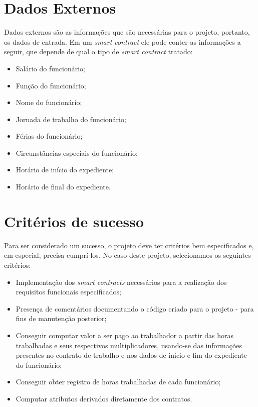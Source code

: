 \documentclass{article}
\begin{document}
\section{Dados Externos}
Dados externos são as informações que são necessárias para o projeto, portanto, os dados de entrada. Em um \textit{smart contract} ele pode conter as informações a seguir, que depende de qual o tipo de \textit{smart contract} tratado:
\begin{itemize}
    \item Salário do funcionário;
    \item Função do funcionário;
    \item Nome do funcionário;
    \item Jornada de trabalho do funcionário;
    \item Férias do funcionário;
    \item Circunstâncias especiais do funcionário;
    \item Horário de início do expediente;
    \item Horário de final do expediente.
\end{itemize}

\section{Critérios de sucesso}
Para ser considerado um sucesso, o projeto deve ter critérios bem especificados e, em especial, precisa cumprí-los. No caso deste projeto, selecionamos os seguintes critérios:

\begin{itemize}
    \item Implementação dos \textit{smart contracts} necessários para a realização dos requisitos funcionais especificados;
    \item Presença de comentários documentando o código criado para o projeto - para fins de manutenção posterior;
    \item Conseguir computar valor a ser pago ao trabalhador a partir das horas trabalhadas e seus respectivos multiplicadores, usando-se das informações presentes no contrato de trabalho e nos dados de inicio e fim do expediente do funcionário;
    \item Conseguir obter registro de horas trabalhadas de cada funcionário;
    \item Computar atributos derivados diretamente dos contratos.
\end{itemize}
\end{document}
